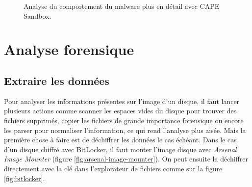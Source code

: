 \begin{figure}
    \centering
    \caption{Analyse du comportement du malware plus en détail avec CAPE Sandbox.}
    \label{fig:cape-analysis}
\end{figure}










\section{Analyse forensique}





\subsection{Extraire les données}

Pour analyser les informations présentes sur l'image d'un disque, il faut lancer plusieurs actions comme scanner les espaces vides du disque pour trouver des fichiers supprimés, copier les fichiers de grande importance forensique ou encore les parser pour normaliser l'information, ce qui rend l'analyse plus aisée. Mais la première chose à faire est de déchiffrer les données le cas échéant. Dans le cas d'un disque chiffré avec BitLocker, il faut monter l'image disque avec \textit{Arsenal Image Mounter} (figure \ref{fig:arsenal-image-mounter}). On peut ensuite la déchiffrer directement avec la clé dans l'explorateur de fichiers comme sur la figure \ref{fig:bitlocker}.

